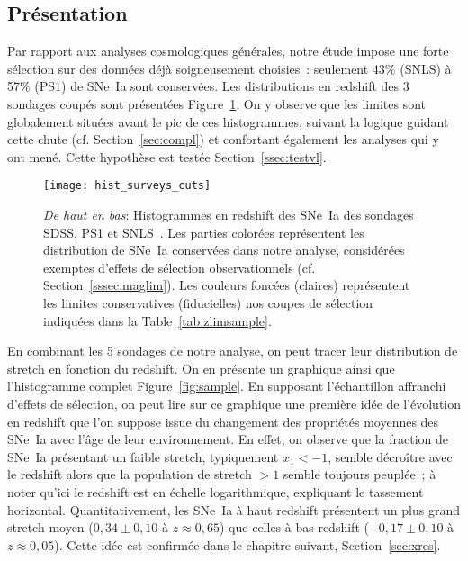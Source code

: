 \documentclass[../main/main.tex]{subfiles}
\begin{document}
\subsection{Présentation}\label{ssec:dataset}

Par rapport aux analyses cosmologiques générales, notre étude impose une forte
sélection sur des données déjà soigneusement choisies~: seulement 43\% (SNLS) à
57\% (PS1) de SNe~Ia sont conservées. Les distributions en redshift des 3
sondages coupés sont présentées Figure~\ref{fig:cuts}. On y observe que les
limites sont globalement situées avant le pic de ces histogrammes, suivant la
logique guidant cette chute (cf. Section~\ref{sec:compl}) et confortant
également les analyses qui y ont mené. Cette hypothèse est testée
Section~\ref{ssec:testvl}.

\begin{figure}
    \centering
    \texttt{[image: hist\_surveys\_cuts]}
    \caption[Histogrammes des sondages coupés pour notre étude]{\textit{De haut
        en bas}: Histogrammes en redshift des SNe~Ia des sondages SDSS, PS1 et
        SNLS~\citep[données de Pantheon,][]{scolnic2018}. Les parties colorées
        représentent les distribution de SNe~Ia conservées dans notre analyse,
        considérées exemptes d'effets de sélection observationnels (cf.
        Section~\ref{sssec:maglim}). Les couleurs foncées (claires) représentent
        les limites conservatives (fiducielles) nos coupes de sélection
    indiquées dans la Table~\ref{tab:zlimsample}.}
    \label{fig:cuts}
\end{figure}

En combinant les 5 sondages de notre analyse, on peut tracer leur distribution
de stretch en fonction du redshift. On en présente un graphique ainsi que
l'histogramme complet Figure~\ref{fig:sample}. En supposant l'échantillon
affranchi d'effets de sélection, on peut lire sur ce graphique une première idée
de l'évolution en redshift que l'on suppose issue du changement des propriétés
moyennes des SNe~Ia avec l'âge de leur environnement. En effet, on observe que
la fraction de SNe~Ia présentant un faible stretch, typiquement $x_1 < -1$,
semble décroître avec le redshift alors que la population de stretch $> 1$
semble toujours peuplée~; à noter qu'ici le redshift est en échelle
logarithmique, expliquant le tassement horizontal. Quantitativement, les SNe~Ia
à haut redshift présentent un plus grand stretch moyen ($0,34 \pm 0,10$ à
$z \approx 0,65$) que celles à bas redshift ($-0,17 \pm 0,10$ à $z \approx
0,05$). Cette idée est confirmée dans le chapitre suivant,
Section~\ref{sec:xres}.
\end{document}
